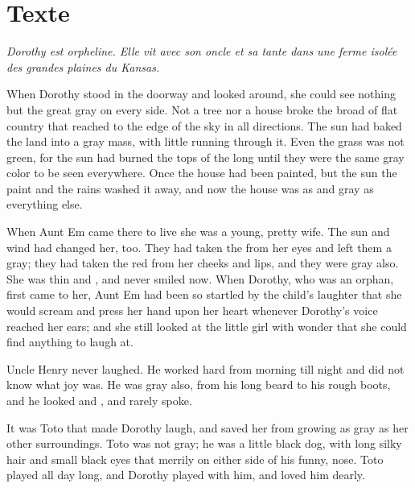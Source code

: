 \documentclass[troisieme]{fiche}
\begin{document}

\newpage
\section{Texte}

\noindent\small\textit{Dorothy est orpheline. Elle vit avec son oncle et sa tante dans une
ferme isolée des grandes plaines du Kansas.}\normalsize

\begin{texte}
When Dorothy stood in the doorway and looked around, she could see nothing but the great gray
 on every side. Not a tree nor a house
broke the broad  of flat country that reached to the edge of
the sky in all directions. The sun had baked the  land into a
gray mass, with little  running through it. Even the grass
was not green, for the sun had burned the tops of the long  until they were the same gray color to be seen everywhere. Once the house had been
painted, but the sun  the paint and the rains washed
it away, and now the house was as  and gray as everything else.

When Aunt Em came there to live she was a young, pretty wife. The sun and wind had changed
her, too. They had taken the  from her eyes and left them a
 gray; they had taken the red from her cheeks and lips, and
they were gray also. She was thin and , and never smiled now. When
Dorothy, who was an orphan, first came to her, Aunt Em had been so startled by the child's
laughter that she would scream and press her hand upon her heart whenever Dorothy's
 voice reached her ears; and she still looked at the little girl with
wonder that she could find anything to laugh at.

Uncle Henry never laughed. He worked hard from morning till night and did not know what joy
was. He was gray also, from his long beard to his rough boots, and he looked
 and , and rarely spoke.

It was Toto that made Dorothy laugh, and saved her from growing as gray as her other
surroundings. Toto was not gray; he was a little black dog, with long silky hair and small
black eyes that  merrily on either side of his funny,
 nose. Toto played all day long, and Dorothy played with him, and
loved him dearly.
\end{texte}
\end{document}
